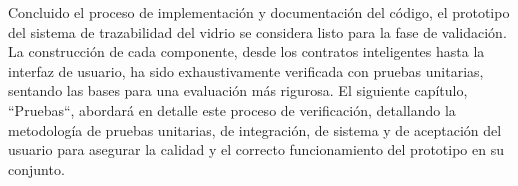Concluido el proceso de implementación y documentación del código, el prototipo del sistema de trazabilidad del vidrio se considera listo para la fase de validación. La construcción de cada componente, desde los contratos inteligentes hasta la interfaz de usuario, ha sido exhaustivamente verificada con pruebas unitarias, sentando las bases para una evaluación más rigurosa. El siguiente capítulo, ``Pruebas``, abordará en detalle este proceso de verificación, detallando la metodología de pruebas unitarias, de integración, de sistema y de aceptación del usuario para asegurar la calidad y el correcto funcionamiento del prototipo en su conjunto.
